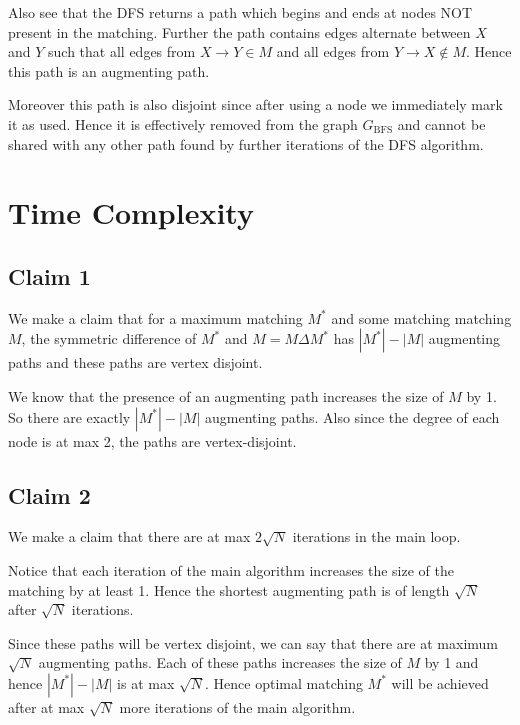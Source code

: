 \documentclass{article}
\begin{document}
Also see that the DFS returns a path which begins and ends at nodes NOT present in the matching. Further the path contains edges alternate between $X$ and $Y$ such that all edges from $X \to Y \in M$ and all edges from $Y \to X \notin M$. Hence this path is an augmenting path.

Moreover this path is also disjoint since after using a node we immediately mark it as used. Hence it is effectively removed from the graph $G_{\mathrm{BFS}}$ and cannot be shared with any other path found by further iterations of the DFS algorithm.

\section{Time Complexity}

\subsection{Claim 1}
We make a claim that for a maximum matching $M^*$ and some matching matching $M$, the symmetric difference of $M^*$ and $M = M \Delta M^*$ has $|M^*|-|M|$ augmenting paths and these paths are vertex disjoint. 

We know that the presence of an augmenting path increases the size of $M$ by 1. So there are exactly $|M^*|-|M|$ augmenting paths. Also since the degree of each node is at max 2, the paths are vertex-disjoint.

\subsection{Claim 2}
We make a claim that there are at max $2\sqrt{N}$ iterations in the main loop. 

Notice that each iteration of the main algorithm increases the size of the matching by at least 1. Hence the shortest augmenting path is of length $\sqrt{N}$ after $\sqrt{N}$ iterations.

Since these paths will be vertex disjoint, we can say that there are at maximum $\sqrt{N}$ augmenting paths. Each of these paths increases the size of $M$ by 1 and hence $|M^*|-|M|$ is at max $\sqrt{N}$. Hence optimal matching $M^*$ will be achieved after at max $\sqrt{N}$ more iterations of the main algorithm.
\end{document}
